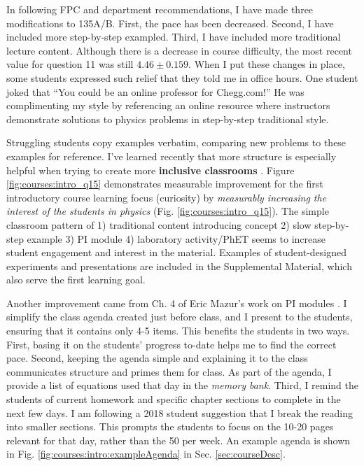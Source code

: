 \documentclass[../../main.tex]{subfiles}
\begin{document}
In following FPC and department recommendations, I have made three modifications to 135A/B.  First, the pace has been decreased.  Second, I have included more step-by-step exampled.  Third, I have included more traditional lecture content.  Although there is a decrease in course difficulty, the most recent value for question 11 was still $4.46 \pm 0.159$.  When I put these changes in place, some students expressed such relief that they told me in office hours.  One student joked that ``You could be an online professor for Chegg.com!'' He was complimenting my style by referencing an online resource where instructors demonstrate solutions to physics problems in step-by-step traditional style.  \\ \hspace{0.1cm}

Struggling students copy examples verbatim, comparing new problems to these examples for reference.  I've learned recently that more structure is especially helpful when trying to create more \textbf{inclusive classrooms} \cite{inclusive}. Figure \ref{fig:courses:intro_q15} demonstrates measurable improvement for the first introductory course learning focus (curiosity) by \textit{measurably increasing the interest of the students in physics} (Fig. \ref{fig:courses:intro_q15}).  The simple classroom pattern of 1) traditional content introducing concept 2) slow step-by-step example 3) PI module 4) laboratory activity/PhET seems to increase student engagement and interest in the material.  Examples of student-designed experiments and presentations are included in the Supplemental Material, which also serve the first learning goal.\\ \hspace{0.1cm}

Another improvement came from Ch. 4 of Eric Mazur's work on PI modules \cite{mazur}.  I simplify the class agenda created just before class, and I present to the students, ensuring that it contains only 4-5 items.  This benefits the students in two ways.  First, basing it on the students' progress to-date helps me to find the correct pace.  Second, keeping the agenda simple and explaining it to the class communicates structure and primes them for class.  As part of the agenda, I provide a list of equations used that day in the \textit{memory bank}.  Third, I remind the students of current homework and specific chapter sections to complete in the next few days.  I am following a 2018 student suggestion that I break the reading into smaller sections.  This prompts the students to focus on the 10-20 pages relevant for that day, rather than the 50 per week.  An example agenda is shown in Fig. \ref{fig:courses:intro:exampleAgenda} in Sec. \ref{sec:courseDesc}. \\ \hspace{0.1cm}
\end{document}
